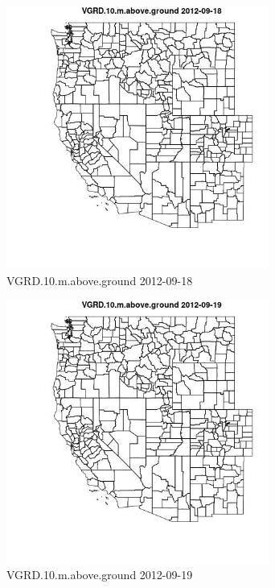 \begin{figure} 
\centering  
\includegraphics[width=0.77\textwidth]{Code_Outputs/ML_input_report_ML_input_PM25_Step5_part_d_de_duplicated_aves_ML_input_MapObsVGRD10maboveground2012-09-18.jpg} 
\caption{\label{fig:ML_input_report_ML_input_PM25_Step5_part_d_de_duplicated_aves_ML_inputMapObsVGRD10maboveground2012-09-18}VGRD.10.m.above.ground 2012-09-18} 
\end{figure} 
 

\begin{figure} 
\centering  
\includegraphics[width=0.77\textwidth]{Code_Outputs/ML_input_report_ML_input_PM25_Step5_part_d_de_duplicated_aves_ML_input_MapObsVGRD10maboveground2012-09-19.jpg} 
\caption{\label{fig:ML_input_report_ML_input_PM25_Step5_part_d_de_duplicated_aves_ML_inputMapObsVGRD10maboveground2012-09-19}VGRD.10.m.above.ground 2012-09-19} 
\end{figure} 
 

